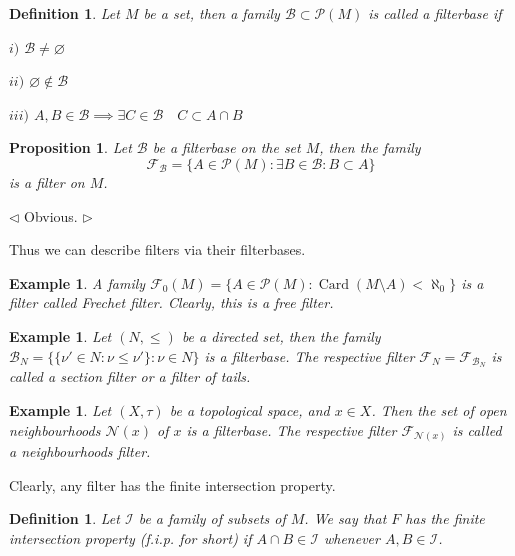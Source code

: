 \documentclass[12pt]{article}
\newtheorem{proposition}[theorem]{Proposition}
\newtheorem{definition}[theorem]{Definition}
\newtheorem{example}[theorem]{Example}
\newenvironment{proof}{\par $\triangleleft$}{$\triangleright$}
\begin{document}
\begin{definition}\label{DefFilterBase} Let $M$ be a set, then a family $\mathcal{B}\subset\mathcal{P}(M)$ is called a filterbase if

$i)$ $\mathcal{B}\neq\varnothing$

$ii)$ $\varnothing\notin\mathcal{B}$

$iii)$ $A,B\in\mathcal{B}\implies \exists C\in\mathcal{B}\quad C\subset A\cap B$
\end{definition}

\begin{proposition}\label{PrFilterFromFilterBase} Let $\mathcal{B}$ be a filterbase on the set $M$, then the family
$$
\mathcal{F}_{\mathcal{B}}=\{A\in\mathcal{P}(M):\exists B\in\mathcal{B}: B\subset A\}
$$
is a filter on $M$.
\end{proposition}
\begin{proof} Obvious.
\end{proof}

Thus we can describe filters via their filterbases.

\begin{example}\label{ExFrechetFilter} A family $\mathcal{F}_0(M)=\{A\in\mathcal{P}(M):\operatorname{Card}(M\setminus A)<\aleph_0\}$ is a filter called Frechet filter. Clearly, this is a free filter.
\end{example}

\begin{example}\label{ExSectionFilter} Let $(N,\leq )$ be a directed set, then the family $\mathcal{B}_N=\{\{\nu'\in N:\nu\leq\nu'\}:\nu\in N\}$ is a filterbase. The respective filter $\mathcal{F}_N=\mathcal{F}_{\mathcal{B}_N}$ is called a section filter or a filter of tails.
\end{example}

\begin{example}\label{ExNeighbourhoodsFilter} Let $(X,\tau )$ be a topological space, and $x\in X$. Then the set of open neighbourhoods $\mathcal{N}(x)$ of $x$ is a filterbase. The respective filter $\mathcal{F}_{\mathcal{N}(x)}$ is called a neighbourhoods filter.
\end{example}

Clearly, any filter has the finite intersection property.

\begin{definition} Let $\mathcal{I}$ be a family of subsets of $M$. We say that $F$ has the finite intersection property (f.i.p. for short) if $A\cap B\in \mathcal{I}$ whenever $A,B\in \mathcal{I}$. 
\end{definition}
\end{document}
